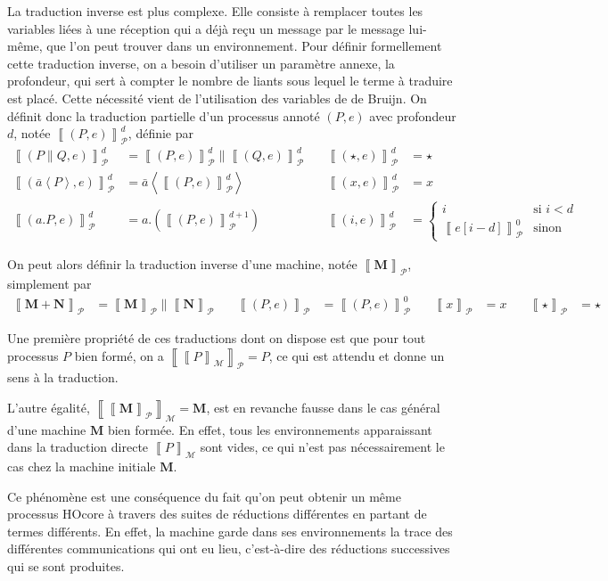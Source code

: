 \documentclass[11pt]{article}
\newcommand{\send}[2]{\bar{#1}\left\langle #2\right\rangle}
\newcommand{\block}[1]{\left[#1\right]}
\newcommand{\paren}[1]{\left(#1\right)}
\newcommand{\machine}[1]{\left\llbracket{#1}\right\rrbracket_{\mathcal{M}}}
\newcommand{\process}[1]{\left\llbracket{#1}\right\rrbracket_{\mathcal{P}}}
\begin{document}
La traduction inverse est plus complexe. Elle consiste à remplacer toutes les variables liées à une réception qui a déjà reçu un message par le message lui-même, que l'on peut trouver dans un environnement.
Pour définir formellement cette traduction inverse, on a besoin d'utiliser un paramètre annexe, la profondeur, qui sert à compter le nombre de liants sous lequel le terme à traduire est placé.
Cette nécessité vient de l'utilisation des variables de de Bruijn.
On définit donc la traduction partielle d'un processus annoté $(P,e)$ avec profondeur $d$, notée $\process{(P,e)}^d$, définie par
\begin{align*}
\process{(P\parallel Q,e)}^d &= \process{(P,e)}^d \parallel \process{(Q,e)}^d
&\quad \process{(\star,e)}^d &= \star\\
\process{(\send{a}P,e)}^d &= \send{a}{\process{(P,e)}^d}
&\quad \process{(x,e)}^d &= x\\
\process{(a.P,e)}^d &= a.\paren{\process{(P,e)}^{d+1}}
&\quad\process{(i,e)}^d &= \left\{ \begin{array}{ll}
i & \text{si } i<d\\
\process{e\block{i-d}}^0 & \text{sinon}
\end{array}\right.
\end{align*}

On peut alors définir la traduction inverse d'une machine, notée $\process{\mathbf{M}}$, simplement par
\begin{align*}
\process{\mathbf{M+N}} &= \process{\mathbf{M}} \parallel \process{\mathbf{N}}
&\quad \process{(P,e)} &= \process{(P,e)}^0
&\quad\process{x} &= x &\quad \process{\star} &= \star
\end{align*}

Une première propriété de ces traductions dont on dispose est que pour tout processus $P$ bien formé, on a $\process{\machine{P}} = P$, ce qui est attendu et donne un sens à la traduction.

L'autre égalité, $\machine{\process{\mathbf{M}}} = \mathbf{M}$, est en revanche fausse dans le cas général d'une machine $\mathbf{M}$ bien formée. En effet, tous les environnements apparaissant dans la traduction directe $\machine{P}$ sont vides, ce qui n'est pas nécessairement le cas chez la machine initiale $\mathbf{M}$.

Ce phénomène est une conséquence du fait qu'on peut obtenir un même processus HOcore à travers des suites de réductions différentes en partant de termes différents. En effet, la machine garde dans ses environnements la trace des différentes communications qui ont eu lieu, c'est-à-dire des réductions successives qui se sont produites.
\end{document}
